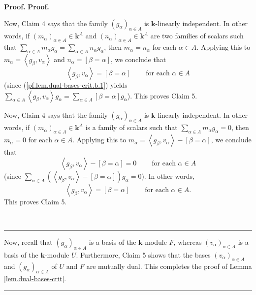 \documentclass[numbers=enddot,12pt,final,onecolumn,notitlepage]{scrartcl}%
\theoremstyle{definition}
\newenvironment{proof}[1][Proof]{\noindent\textbf{#1.} }{\ \rule{0.5em}{0.5em}}
\let\sumnonlimits\sum
\renewcommand{\sum}{\sumnonlimits\limits}
\newenvironment{verlong}{}{}
\newenvironment{vershort}{}{}
\begin{document}
\begin{proof}
\begin{proof}
\begin{verlong}
\end{verlong}

\begin{vershort}
Now, Claim 4 says that the family $\left(  g_{\alpha}\right)  _{\alpha\in A}$
is $\mathbf{k}$-linearly independent. In other words, if $\left(  m_{\alpha
}\right)  _{\alpha\in A}\in\mathbf{k}^{A}$ and $\left(  n_{\alpha}\right)
_{\alpha\in A}\in\mathbf{k}^{A}$ are two families of scalars such that
$\sum_{\alpha\in A}m_{\alpha}g_{\alpha}=\sum_{\alpha\in A}n_{\alpha}g_{\alpha
}$, then $m_{\alpha}=n_{\alpha}$ for each $\alpha\in A$. Applying this to
$m_{\alpha}=\left\langle g_{\beta},v_{\alpha}\right\rangle $ and $n_{\alpha
}=\left[  \beta=\alpha\right]  $, we conclude that
\[
\left\langle g_{\beta},v_{\alpha}\right\rangle =\left[  \beta=\alpha\right]
\ \ \ \ \ \ \ \ \ \ \text{for each }\alpha\in A
\]
(since (\ref{pf.lem.dual-bases-crit.b.1}) yields $\sum_{\alpha\in
A}\left\langle g_{\beta},v_{\alpha}\right\rangle g_{\alpha}=\sum_{\alpha\in
A}\left[  \beta=\alpha\right]  g_{\alpha}$). This proves Claim 5. \qedhere

\end{vershort}

\begin{verlong}
Now, Claim 4 says that the family $\left(  g_{\alpha}\right)  _{\alpha\in A}$
is $\mathbf{k}$-linearly independent. In other words, if $\left(  m_{\alpha
}\right)  _{\alpha\in A}\in\mathbf{k}^{A}$ is a family of scalars such that
$\sum_{\alpha\in A}m_{\alpha}g_{\alpha}=0$, then $m_{\alpha}=0$ for each
$\alpha\in A$. Applying this to $m_{\alpha}=\left\langle g_{\beta},v_{\alpha
}\right\rangle -\left[  \beta=\alpha\right]  $, we conclude that
\[
\left\langle g_{\beta},v_{\alpha}\right\rangle -\left[  \beta=\alpha\right]
=0\ \ \ \ \ \ \ \ \ \ \text{for each }\alpha\in A
\]
(since $\sum_{\alpha\in A}\left(  \left\langle g_{\beta},v_{\alpha
}\right\rangle -\left[  \beta=\alpha\right]  \right)  g_{\alpha}=0$). In other
words,%
\[
\left\langle g_{\beta},v_{\alpha}\right\rangle =\left[  \beta=\alpha\right]
\ \ \ \ \ \ \ \ \ \ \text{for each }\alpha\in A.
\]
This proves Claim 5. \qedhere

\end{verlong}
\end{proof}

Now, recall that $\left(  g_{\alpha}\right)  _{\alpha\in A}$ is a basis of the
$\mathbf{k}$-module $F$, whereas $\left(  v_{\alpha}\right)  _{\alpha\in A}$
is a basis of the $\mathbf{k}$-module $U$. Furthermore, Claim 5 shows that the
bases $\left(  v_{\alpha}\right)  _{\alpha\in A}$ and $\left(  g_{\alpha
}\right)  _{\alpha\in A}$ of $U$ and $F$ are mutually dual. This completes the
proof of Lemma \ref{lem.dual-bases-crit}.
\end{proof}
\end{document}
